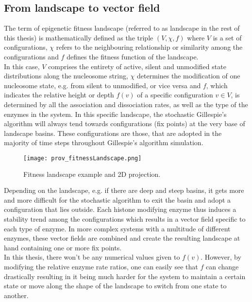         \subsection{From landscape to vector field}
            The term of epigenetic fitness landscape (referred to as landscape in the rest of this thesis) is mathematically defined as the triple $(V, \chi, f)$ where $V$ is a set of configurations, $\chi$ refers to the neighbouring relationship or similarity among the configurations and $f$ defines the fitness function of the landscape.\\ %
            In this case, $V$ comprises the entirety of active, silent and unmodified state distributions along the nucleosome string, $\chi$ determines the modification of one nucleosome state, e.g. from silent to unmodified, or vice versa and $f$, which indicates the relative height or depth $f(v)$ of a specific configuration $v \in V$, is determined by all the association and dissociation rates, as well as the type of the enzymes in the system. In this specific landscape, the stochastic Gillespie's algorithm will always tend towards configurations (fix points) at the very base of landscape basins. These configurations are those, that are adopted in the majority of time steps throughout Gillespie's algorithm simulation.\\
            \begin{figure}[htpb!]
                \centering
                \texttt{[image: prov\_fitnessLandscape.png]}
                \caption{Fitness landscape example and 2D projection.} %
                \label{img:fitnessLandscape}
            \end{figure}
            Depending on the landscape, e.g. if there are deep and steep basins, it gets more and more difficult for the stochastic algorithm to exit the basin and adopt a configuration that lies outside. Each histone modifying enzyme thus induces a stability trend among the configurations which results in a vector field specific to each type of enzyme. In more complex systems with a multitude of different enzymes, these vector fields are combined %
            and create the resulting landscape at hand containing one or more fix points.\\
            In this thesis,  there won't be any numerical values given to $f(v)$. However, by modifying the relative enzyme rate ratios, one can easily see that $f$ can change drastically resulting in it being much harder for the system to maintain a certain state or move along the shape of the landscape to switch from one state to another.\\ %

